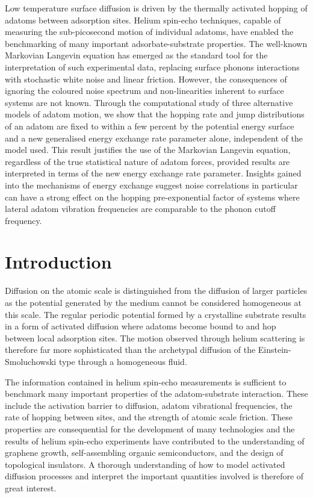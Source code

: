 \documentclass[7pt]{article}
\begin{document}
Low temperature surface diffusion is driven by the thermally activated hopping of adatoms between adsorption sites. Helium spin-echo techniques, capable of measuring the sub-picosecond motion of individual adatoms, have enabled the benchmarking of many important adsorbate-substrate properties. The well-known Markovian Langevin equation has emerged as the standard tool for the interpretation of such experimental data, replacing surface phonons interactions with stochastic white noise and linear friction. However, the consequences of ignoring the coloured noise spectrum and non-linearities inherent to surface systems are not known. Through the computational study of three alternative models of adatom motion, we show that the hopping rate and jump distributions of an adatom are fixed to within a few percent by the potential energy surface and a new generalised energy exchange rate parameter alone, independent of the model used. This result justifies the use of the Markovian Langevin equation, regardless of the true statistical nature of adatom forces, provided results are interpreted in terms of the new energy exchange rate parameter. Insights gained into the mechanisms of energy exchange suggest noise correlations in particular can have a strong effect on the hopping pre-exponential factor of systems where lateral adatom vibration frequencies are comparable to the phonon cutoff frequency.

\section*{Introduction}

Diffusion on the atomic scale is distinguished from the diffusion of larger particles as the potential generated by the medium cannot be considered homogeneous at this scale\cite{Jardine2004}. The regular periodic potential formed by a crystalline substrate results in a form of activated diffusion where adatoms become bound to and hop between local adsorption sites. The motion observed through helium scattering is therefore far more sophisticated than the archetypal diffusion of the Einstein-Smoluchowski type through a homogeneous fluid\cite{Jardine200906}.

The information contained in helium spin-echo measurements is sufficient to benchmark many important properties of the adatom-substrate interaction. These include the activation barrier to diffusion, adatom vibrational frequencies, the rate of hopping between sites, and the strength of atomic scale friction\cite{Jardine200911, Lechner2015, Alexandrowicz, Hedgeland}. These properties are consequential for the development of many technologies and the results of helium spin-echo experiments have contributed to the understanding of graphene growth, self-assembling organic semiconductors, and the design of topological insulators\cite{Tamtgl2015, Townsend, Sacchi, Tamtgl2020}. A thorough understanding of how to model activated diffusion processes and interpret the important quantities involved is therefore of great interest.
 
\end{document}
